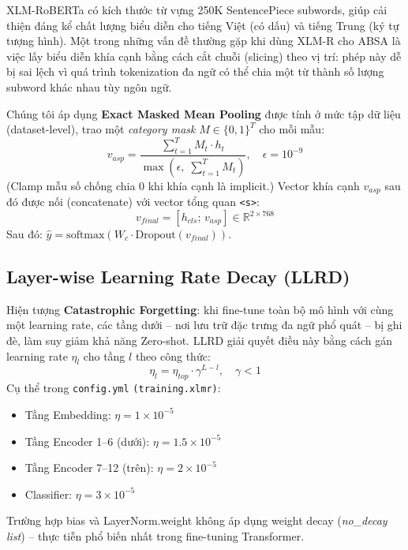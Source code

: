 \documentclass[12pt,a4paper,oneside]{report}
\begin{document}
XLM-RoBERTa có kích thước từ vựng 250K SentencePiece subwords, giúp cải thiện đáng kể chất lượng biểu diễn cho tiếng Việt (có dấu) và tiếng Trung (ký tự tượng hình). Một trong những vấn đề thường gặp khi dùng XLM-R cho ABSA là việc lấy biểu diễn khía cạnh bằng cách cắt chuỗi (slicing) theo vị trí: phép này dễ bị sai lệch vì quá trình tokenization đa ngữ có thể chia một từ thành số lượng subword khác nhau tùy ngôn ngữ.

Chúng tôi áp dụng \textbf{Exact Masked Mean Pooling} được tính ở mức tập dữ liệu (dataset-level), trao một \textit{category mask} $M \in \{0,1\}^T$ cho mỗi mẫu:
\begin{equation}
    v_{asp} = \frac{\sum_{t=1}^{T} M_t \cdot h_t}{\max\!\left(\epsilon,\; \sum_{t=1}^{T} M_t\right)}, \quad \epsilon = 10^{-9}
\end{equation}
(Clamp mẫu số chống chia 0 khi khía cạnh là implicit.) Vector khía cạnh $v_{asp}$ sau đó được nối (concatenate) với vector tổng quan \texttt{<s>}:
\begin{equation}
    v_{final} = [h_{cls};\, v_{asp}] \in \mathbb{R}^{2 \times 768}
\end{equation}
Sau đó: $\hat{y} = \text{softmax}(W_c \cdot \text{Dropout}(v_{final}))$.

\subsection{Layer-wise Learning Rate Decay (LLRD)}

Hiện tượng \textbf{Catastrophic Forgetting}: khi fine-tune toàn bộ mô hình với cùng một learning rate, các tầng dưới -- nơi lưu trữ đặc trưng đa ngữ phổ quát -- bị ghi đè, làm suy giảm khả năng Zero-shot. LLRD giải quyết điều này bằng cách gán learning rate $\eta_l$ cho tầng $l$ theo công thức:
\begin{equation}
    \eta_l = \eta_{top} \cdot \gamma^{L - l}, \quad \gamma < 1
\end{equation}
Cụ thể trong \texttt{config.yml} \texttt{(training.xlmr)}:
\begin{itemize}
    \item Tầng Embedding: $\eta = 1 \times 10^{-5}$
    \item Tầng Encoder 1--6 (dưới): $\eta = 1.5 \times 10^{-5}$
    \item Tầng Encoder 7--12 (trên): $\eta = 2 \times 10^{-5}$
    \item Classifier: $\eta = 3 \times 10^{-5}$
\end{itemize}
Trường hợp bias và LayerNorm.weight không áp dụng weight decay (\textit{no\_decay list}) -- thực tiễn phổ biến nhất trong fine-tuning Transformer.
\end{document}
